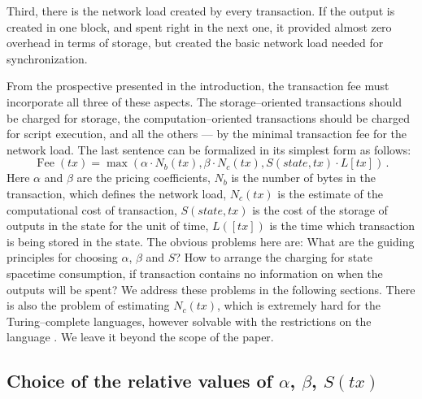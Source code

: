 \documentclass[]{llncs}   %
\newcommand{\authnote}[2]{\marginpar{\parbox{\marginparwidth}{\tiny %
  \textsf{#1 {\textcolor{blue}{notes: #2}}}}}%
  \textcolor{blue}{\textbf{\dag}}}
\newcommand{\authnote}[2]{
  \textsf{#1\textcolor{blue}{ #2}}}
\newcommand{\authnote}[2]{}
\newcommand{\vk}[1]{{\authnote{\textcolor{red}{V:}}{#1}}}
\begin{document}
Third, there is the network load created by every transaction. If
the output is created in one block, and spent right in the next one, it provided
almost zero overhead in terms of storage, but created the basic network load
needed for synchronization.

From the prospective presented in the introduction, the transaction fee must
incorporate all three of these aspects. The storage--oriented transactions should
be charged for storage, the computation--oriented transactions should be charged
for script execution, and all the others --- by the minimal transaction fee for
the network load. The last sentence can be formalized in its simplest form as follows:
\begin{equation}
    \operatorname{Fee}(tx) = \max(\alpha \cdot N_b(tx), \beta \cdot N_c(tx),
    S(state,tx) \cdot L[tx])\,.
    \label{eq:max}
\end{equation}
Here $\alpha$ and $\beta$ are the pricing coefficients, $N_b$ is the
number of bytes in the transaction, which defines the network load, $N_c(tx)$ is
the estimate of the computational cost of transaction, $S(state,tx)$ is the cost of
the storage of outputs in the state for the unit of time, $L([tx])$ is the time which
transaction is being stored in the state. \vk{Oops. Do we mean now that if the
    transaction frees the space in the state, the corresponding output can be
stored forever? If yes, it cancels vast part of the reasoning: I create $tx_0$ with
two outputs; in the next block $tx_1$ merging them, and store the output of
$tx_1$ for free.} The obvious problems here are: What are the guiding principles
for choosing $\alpha$, $\beta$ and $S$? How to arrange the charging for state
spacetime consumption, if transaction contains no information on when the
outputs will be spent? We address these problems in the following sections.
There is also the problem of estimating $N_c(tx)$, which is extremely hard \vk{or
unsolvable?} \vk{How hard, does anybody know the specific name of this problem?}
for the Turing--complete languages, however solvable with the restrictions on the
language\vk{citations, which restrictions, or stick to one existing}. We leave
it beyond the scope of the paper.

\subsection{Choice of the relative values of $\alpha$, $\beta$, $S(tx)$}
\end{document}
